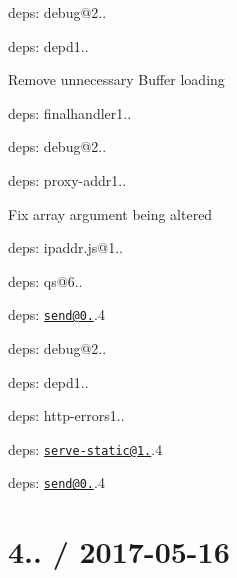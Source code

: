 \begin{DoxyItemize}
\item deps\+: debug@2..
\item deps\+: depd1..
\begin{DoxyItemize}
\item Remove unnecessary {\ttfamily Buffer} loading
\end{DoxyItemize}
\item deps\+: finalhandler1..
\begin{DoxyItemize}
\item deps\+: debug@2..
\end{DoxyItemize}
\item deps\+: proxy-\/addr1..
\begin{DoxyItemize}
\item Fix array argument being altered
\item deps\+: ipaddr.\+js@1..
\end{DoxyItemize}
\item deps\+: qs@6..
\item deps\+: \href{mailto:send@0.15}{\tt send@0.}.4
\begin{DoxyItemize}
\item deps\+: debug@2..
\item deps\+: depd1..
\item deps\+: http-\/errors1..
\end{DoxyItemize}
\item deps\+: \href{mailto:serve-static@1.12}{\tt serve-\/static@1.}.4
\begin{DoxyItemize}
\item deps\+: \href{mailto:send@0.15}{\tt send@0.}.4
\end{DoxyItemize}
\end{DoxyItemize}

\section*{4.. / 2017-\/05-\/16 }


